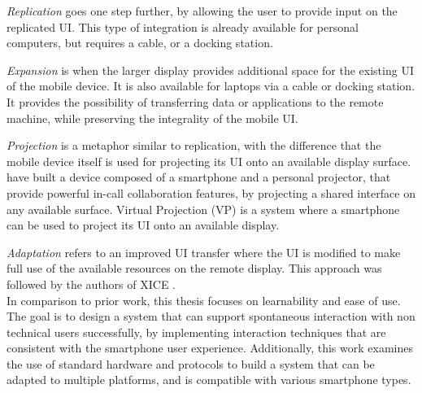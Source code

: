 \emph{Replication} goes one step further, by allowing the user to provide input on the replicated UI.
This type of integration is already available for personal computers, but requires a cable, or a docking station.

\emph{Expansion} is when the larger display provides additional space for the existing UI of the mobile device.
It is also available for laptops via a cable or docking station.
It provides the possibility of transferring data or applications to the remote  machine, while preserving the integrality of the mobile UI.

\emph{Projection} is a metaphor similar to replication, with the difference that the mobile device itself is used for projecting its UI onto an available display surface.
\cite{Winkler:2011:interactivephonecall} have built a device composed of a smartphone and a personal projector, that provide powerful in-call collaboration features, by projecting a shared interface on any available surface.
Virtual Projection (VP) \citep{Baur:2012:virtualprojection} is a system where a smartphone can be used to project its UI onto an available display.

\emph{Adaptation} refers to an improved UI transfer where the UI is modified to make full use of the available resources on the remote display.
This approach was followed by the authors of XICE \citep{Arthur:2011:xice}.
\\
\linebreak
In comparison to prior work, this thesis focuses on learnability and ease of use.
The goal is to design a system that can support spontaneous interaction with non technical users successfully, by implementing interaction techniques that are consistent with the smartphone user experience.
Additionally, this work examines the use of standard hardware and protocols to build a system that can be adapted to multiple platforms, and is compatible with various smartphone types.

